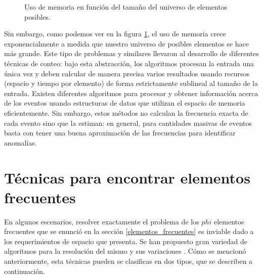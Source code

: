 \documentclass[a4paper,10pt, oneside]{article}
\begin{document}
\begin{figure}[ht]
	\centering

	\caption{Uso de memoria en función del tamaño del universo de elementos posibles.}
	\label{fig:universe_exponencial}
\end{figure}

Sin embargo, como podemos ver en la figura \ref{fig:universe_exponencial}, el uso de memoria crece exponencialmente a medida que nuestro universo de posibles elementos se hace más grande.
Este tipo de problemas y similares llevaron al desarrollo de diferentes técnicas de conteo: bajo esta abstracción, los algoritmos procesan la entrada una única vez y deben calcular de manera precisa varios resultados usando recursos (espacio y tiempo por elemento) de forma estrictamente sublineal al tamaño de la entrada\cite{Muthukrishnan:2005:DSA:1166409.1166410}. Existen diferentes algoritmos para procesar y obtener información acerca de los eventos usando estructuras de datos que utilizan el espacio de memoria eficientemente. Sin embargo, estos métodos no calculan la frecuencia exacta de cada evento sino que la estiman: en general, para cantidades masivas de eventos basta con tener una buena aproximación de las frecuencias para identificar anomalías.

\newpage

\section{Técnicas para encontrar elementos frecuentes}\label{sec:tecnicas_elementos_frecuentes}
En algunos escenarios, resolver exactamente el problema de los $phi$ elementos frecuentes que se enunció en la sección \ref{elementos_frecuentes} es inviable dado a los requerimientos de espacio que presenta\cite{Charikar:2002:FFI:646255.684566}. Se han propuesto gran variedad de algoritmos para la resolución del mismo y sus variaciones \cite{Charikar:2002:FFI:646255.684566}\cite{Cormode:2005:WHW:1061318.1061325}\cite{Demaine:2002:FEI:647912.740658}\cite{Manku:2002:AFC:1287369.1287400}. Cómo se mencionó anteriormente, esta técnicas pueden se clasificas en dos tipos, que se describen a continuación.
\end{document}
